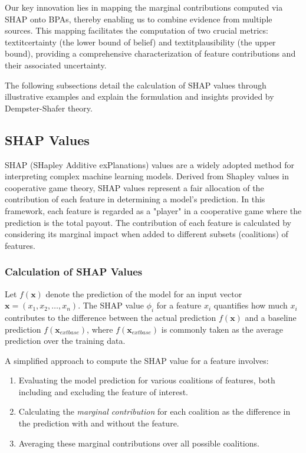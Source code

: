 \documentclass[acmlarge]{acmart}
\begin{document}
Our key innovation lies in mapping the marginal contributions computed via SHAP onto BPAs, thereby enabling us to combine evidence from multiple sources. This mapping facilitates the computation of two crucial metrics: textit{certainty} (the lower bound of belief) and textit{plausibility} (the upper bound), providing a comprehensive characterization of feature contributions and their associated uncertainty.

The following subsections detail the calculation of SHAP values through illustrative examples and explain the formulation and insights provided by Dempster-Shafer theory.


\subsection{SHAP Values}

SHAP (SHapley Additive exPlanations) values are a widely adopted method for interpreting complex machine learning models. Derived from Shapley values in cooperative game theory, SHAP values represent a fair allocation of the contribution of each feature in determining a model's prediction. In this framework, each feature is regarded as a "player" in a cooperative game where the prediction is the total payout. The contribution of each feature is calculated by considering its marginal impact when added to different subsets (coalitions) of features.

\subsubsection{Calculation of SHAP Values}

Let \( f(\mathbf{x}) \) denote the prediction of the model for an input vector \( \mathbf{x} = (x_1, x_2, \dots, x_n) \). The SHAP value \( \phi_i \) for a feature \( x_i \) quantifies how much \( x_i \) contributes to the difference between the actual prediction \( f(\mathbf{x}) \) and a baseline prediction \( f(\mathbf{x}_{ext{base}}) \), where \( f(\mathbf{x}_{ext{base}}) \) is commonly taken as the average prediction over the training data.

A simplified approach to compute the SHAP value for a feature involves:
\begin{enumerate}
    \item Evaluating the model prediction for various coalitions of features, both including and excluding the feature of interest.
    \item Calculating the \emph{marginal contribution} for each coalition as the difference in the prediction with and without the feature.
    \item Averaging these marginal contributions over all possible coalitions.
\end{enumerate}
\end{document}
